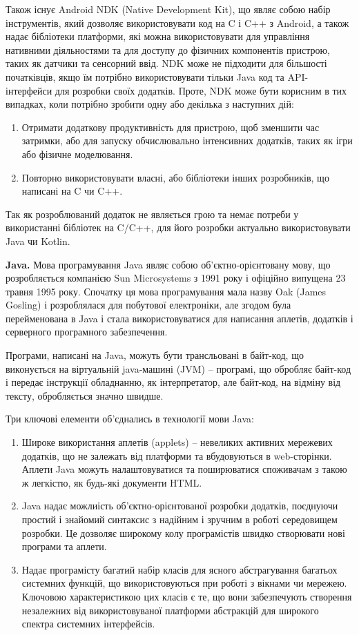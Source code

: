 \documentclass[../main.tex]{subfiles}
\begin{document}
Також існує Android NDK (Native Development Kit), що являє собою набір інструментів, який дозволяє використовувати код на C і C++ з Android, а також надає бібліотеки платформи, які можна використовувати для управління нативними діяльностями та для доступу до фізичних компонентів пристрою, таких як датчики та сенсорний ввід. NDK може не підходити для більшості початківців, якщо їм потрібно використовувати тільки Java код та API-інтерфейси для розробки своїх додатків. Проте, NDK може бути корисним в тих випадках, коли потрібно зробити одну або декілька з наступних дій:

\begin{enumerate}
	\item Отримати додаткову продуктивність для пристрою, щоб зменшити час затримки, або для запуску обчислювально інтенсивних додатків, таких як ігри або фізичне моделювання.
	\item Повторно використовувати власні, або бібліотеки інших розробників, що написані на C чи C++.
\end{enumerate}

Так як розроблюваний додаток не являється грою та немає потреби у використанні бібліотек на C/C++, для його розробки актуально використовувати Java чи Kotlin.

\textbf{Java.}
Мова програмування Java являє собою об'єктно-орієнтовану мову, що розробляється компанією Sun Microsystems з 1991 року і офіційно випущена 23 травня 1995 року. Спочатку ця мова програмування  мала назву Oak (James Gosling) і розроблялася для побутової електроніки, але згодом була перейменована в Java і стала використовуватися для написання аплетів, додатків і серверного програмного забезпечення.

Програми, написані на Java, можуть бути трансльовані в байт-код, що виконується на віртуальній java-машині (JVM) -- програмі, що обробляє байт-код і передає інструкції обладнанню, як інтерпретатор, але байт-код, на відміну від тексту, обробляється значно швидше.

Три ключові елементи об'єднались в технології мови Java:
\begin{enumerate}
	\item Широке використання аплетів (applets) -- невеликих активних мережевих додатків, що не залежать від платформи та вбудовуються в web-сторінки. Аплети Java можуть налаштовуватися та поширюватися споживачам з такою ж легкістю, як будь-які документи HTML.
	\item Java надає можлиість об'єктно-орієнтованої розробки додатків, поєднуючи простий і знайомий синтаксис з надійним і зручним в роботі середовищем розробки. Це дозволяє широкому колу програмістів швидко створювати нові програми та аплети.
	\item Надає програмісту багатий набір класів для ясного абстрагування багатьох системних функцій, що використовуються при роботі з вікнами чи мережею. Ключовою характеристикою цих класів є те, що вони забезпечують створення незалежних від використовуваної платформи абстракцій для широкого спектра системних інтерфейсів.
\end{enumerate}
\end{document}
